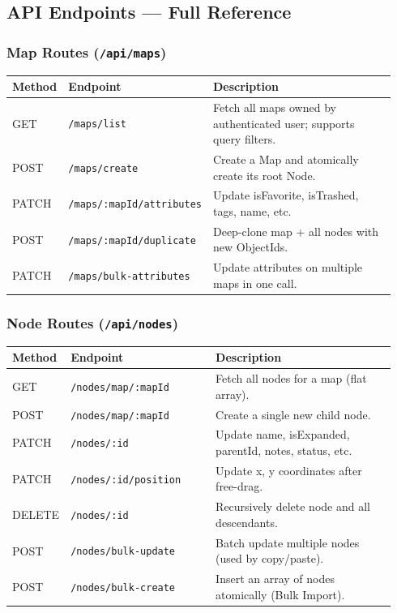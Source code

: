 \documentclass[12pt, a4paper]{article}
\begin{document}
\subsection{API Endpoints — Full Reference}

\subsubsection{Map Routes (\texttt{/api/maps})}
\begin{longtable}{p{0.08\linewidth} p{0.34\linewidth} p{0.52\linewidth}}
\toprule
\textbf{Method} & \textbf{Endpoint} & \textbf{Description} \\
\midrule
GET & \texttt{/maps/list} & Fetch all maps owned by authenticated user; supports query filters. \\
POST & \texttt{/maps/create} & Create a Map and atomically create its root Node. \\
PATCH & \texttt{/maps/:mapId/attributes} & Update isFavorite, isTrashed, tags, name, etc. \\
POST & \texttt{/maps/:mapId/duplicate} & Deep-clone map + all nodes with new ObjectIds. \\
PATCH & \texttt{/maps/bulk-attributes} & Update attributes on multiple maps in one call. \\
\bottomrule
\end{longtable}

\subsubsection{Node Routes (\texttt{/api/nodes})}
\begin{longtable}{p{0.08\linewidth} p{0.38\linewidth} p{0.48\linewidth}}
\toprule
\textbf{Method} & \textbf{Endpoint} & \textbf{Description} \\
\midrule
GET & \texttt{/nodes/map/:mapId} & Fetch all nodes for a map (flat array). \\
POST & \texttt{/nodes/map/:mapId} & Create a single new child node. \\
PATCH & \texttt{/nodes/:id} & Update name, isExpanded, parentId, notes, status, etc. \\
PATCH & \texttt{/nodes/:id/position} & Update x, y coordinates after free-drag. \\
DELETE & \texttt{/nodes/:id} & Recursively delete node and all descendants. \\
POST & \texttt{/nodes/bulk-update} & Batch update multiple nodes (used by copy/paste). \\
POST & \texttt{/nodes/bulk-create} & Insert an array of nodes atomically (Bulk Import). \\
\bottomrule
\end{longtable}
\end{document}
